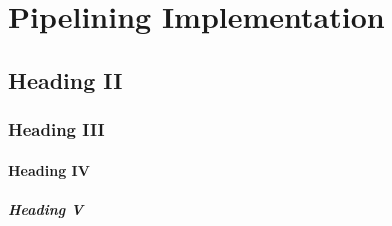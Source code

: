 \section{Pipelining Implementation}
\subsection{Heading II}
\subsubsection{Heading III}
\paragraph{Heading IV}
\subparagraph{Heading V}
